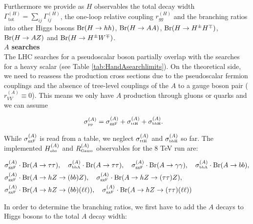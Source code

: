 \documentclass[preprint,3p,12pt]{elsarticle}
\begin{document}
{Furthermore we provide as $H$ observables the total decay width $\Gamma^{(H)}_{\text{tot}}=\sum_{ij}\Gamma_{ij}^{(H)}$, the one-loop relative coupling $r_{gg}^{(H)}$ and the branching ratios into other Higgs bosons ${\rm Br}(H\to hh)$, ${\rm Br}(H\to AA)$, ${\rm Br}(H\to H^\pm H^\mp )$, ${\rm Br}(H\to AZ)$ and ${\rm Br}(H\to H^\pm W^\mp )$.\\

\textbf{$A$ searches}\\

The LHC searches for a pseudoscalar boson partially overlap with the searches for a heavy scalar (see Table \ref{tab:HandAsearchlimits}). On the theoretical side, we need to reassess the production cross sections due to the pseudoscalar fermion couplings and the absence of tree-level couplings of the $A$ to a gauge boson pair ($r_{VV}^{(A)}\equiv 0$). This means we only have $A$ production through gluons or quarks and we can assume

\begin{align}
 \sigma ^{(A)}_{\text{\tiny{pp}}} &= \sigma ^{(A)}_{\text{\tiny{ggF}}} + \sigma ^{(A)}_{\text{\tiny{ttH}}} + \sigma ^{(A)}_{\text{\tiny{bbH}}} .\nonumber
\end{align}

While $\sigma ^{(A)}_{\text{\tiny{ggF}}}$ %
is read from a table, we neglect $\sigma ^{(A)}_{\text{\tiny{ttH}}}$ and $\sigma ^{(A)}_{\text{\tiny{bbH}}}$ so far. The implemented $H^{(A)}_\text{\tiny obs}$ and $R^{(A)}_\text{\tiny Gauss}$ observables for the 8 TeV run are:

\begin{align}
&\sigma ^{(A)}_{\text{\tiny{ggF}}} \cdot {\rm Br}(A\to \tau \tau ) , \quad \sigma ^{(A)}_{\text{\tiny{bbA}}} \cdot {\rm Br}(A\to \tau \tau ), \quad\sigma ^{(A)}_{\text{\tiny{ggF}}} \cdot {\rm Br}(A\to \gamma \gamma ) ,  \quad  \sigma ^{(A)}_{\text{\tiny{bbA}}} \cdot {\rm Br}(A\to bb), \nonumber \\%
&\sigma ^{(A)}_{\text{\tiny{ggF}}} \cdot {\rm Br}(A\to hZ \to (bb)Z),  \quad  \sigma ^{(A)}_{\text{\tiny{ggF}}} \cdot {\rm Br}(A\to hZ \to (\tau \tau )Z), \nonumber \\ %
&\sigma ^{(A)}_{\text{\tiny{ggF}}} \cdot {\rm Br}(A\to hZ \to (bb)(\ell \ell )),  \quad \sigma ^{(A)}_{\text{\tiny{ggF}}} \cdot {\rm Br}(A\to hZ \to (\tau \tau )(\ell \ell )) \nonumber %
\end{align}

In order to determine the branching ratios, we first have to add the $A$ decays to Higgs bosons to the total $A$ decay width:

}
\end{document}
